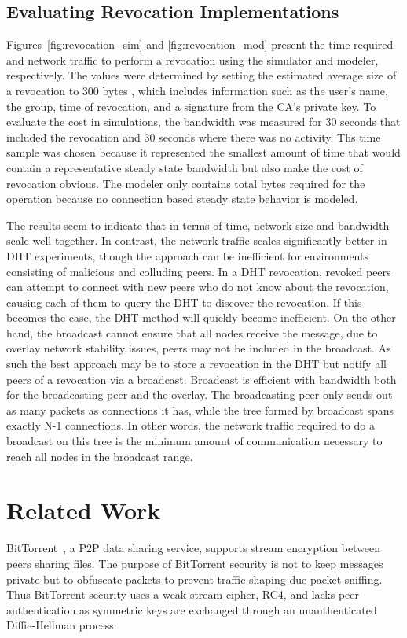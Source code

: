 \subsection{Evaluating Revocation Implementations}
\label{evaluation_revocation}
Figures~\ref{fig:revocation_sim} and \ref{fig:revocation_mod} present the time
required and network traffic to perform a revocation using the simulator and
modeler, respectively.  The values were determined by setting the estimated
average size of a revocation to 300 bytes , which includes information such as
the user's name, the group, time of revocation, and a signature from the CA's
private key.  To evaluate the cost in simulations, the bandwidth was measured
for 30 seconds that included the revocation and 30 seconds where there was no
activity.  Ths time sample was chosen because it represented the smallest
amount of time that would contain a representative steady state bandwidth but
also make the cost of revocation obvious.  The modeler only contains total
bytes required for the operation because no connection based steady state
behavior is modeled.

The results seem to indicate that in terms of time, network size and bandwidth
scale well together.  In contrast, the network traffic scales significantly
better in DHT experiments, though the approach can be inefficient for
environments consisting of malicious and colluding peers.  In a DHT revocation,
revoked peers can attempt to connect with new peers who do not know about the
revocation, causing each of them to query the DHT to discover the revocation.
If this becomes the case, the DHT method will quickly become inefficient.  On
the other hand, the broadcast cannot ensure that all nodes receive the message,
due to overlay network stability issues, peers may not be included in the
broadcast.  As such the best approach may be to store a revocation in the DHT
but notify all peers of a revocation via a broadcast.  Broadcast is efficient
with bandwidth both for the broadcasting peer and the overlay.  The
broadcasting peer only sends out as many packets as connections it has, while
the tree formed by broadcast spans exactly N-1 connections.  In other words,
the network traffic required to do a broadcast on this tree is the minimum
amount of communication necessary to reach all nodes in the broadcast range.

\section{Related Work}
BitTorrent~\cite{bittorrent_security}, a P2P data sharing service,  supports
stream encryption between peers sharing files.  The purpose of BitTorrent
security is not to keep messages private but to obfuscate packets to
prevent traffic shaping due packet sniffing. Thus BitTorrent security uses a
weak stream cipher, RC4, and lacks peer authentication as symmetric keys are
exchanged through an unauthenticated Diffie-Hellman process.

